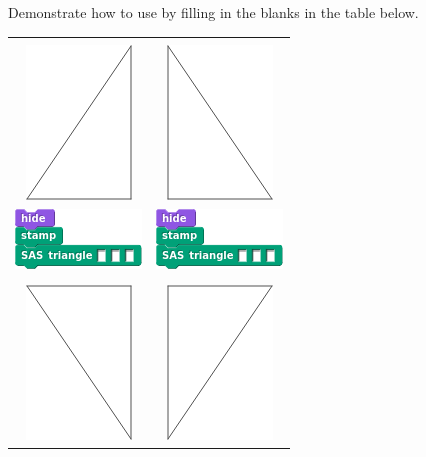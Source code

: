 \documentclass[noauthor,nooutcomes,12pt,hints]{ximera}
\begin{document}
\begin{question}%
  Demonstrate how to use  by filling in the
  blanks in the table below.
  \begin{center}
    \begin{tabular}{|c||c|}\hline
      &  \\
      \includegraphics{EgStageII.png} & \includegraphics{EgStageI.png} \\
      \includegraphics{SASstampBlank.png} & \includegraphics{SASstampBlank.png} \\
      \hline\hline
      &  \\
      \includegraphics{EgStageIII.png} & \includegraphics{EgStageIV.png} \\

\end{tabular}
\end{center}
\end{question}
\end{document}
